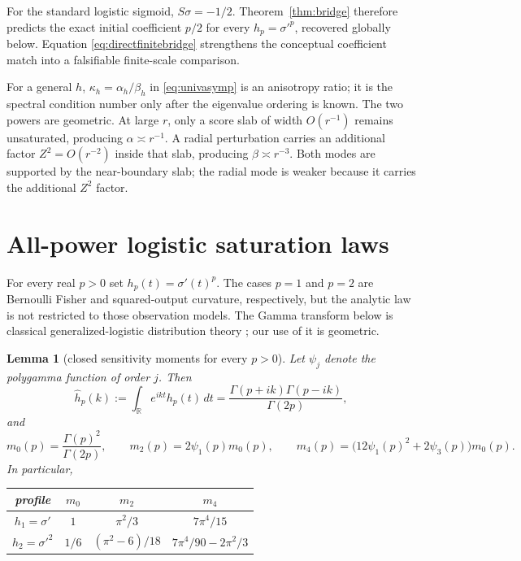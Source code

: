 \documentclass[11pt]{article}
\newtheorem{lemma}[theorem]{Lemma}
\newcommand{\R}{\mathbb R}
\begin{document}
For the standard logistic sigmoid, $S\sigma=-1/2$.  Theorem~\ref{thm:bridge} therefore predicts the exact initial
coefficient $p/2$ for every $h_p=\sigma'^p$, recovered globally below.  Equation
\eqref{eq:directfinitebridge} strengthens the conceptual coefficient match into a falsifiable finite-scale
comparison.

For a general $h$, $\kappa_h=\alpha_h/\beta_h$ in \eqref{eq:univasymp} is an anisotropy ratio; it is the spectral
condition number only after the eigenvalue ordering is known.  The two powers are geometric.  At large $r$, only a
score slab of width $O(r^{-1})$ remains unsaturated, producing
$\alpha\asymp r^{-1}$.  A radial perturbation carries an additional factor $Z^2=O(r^{-2})$ inside that slab,
producing $\beta\asymp r^{-3}$.  Both modes are supported by the near-boundary slab; the radial mode is weaker
because it carries the additional $Z^2$ factor.

\section{All-power logistic saturation laws}

For every real $p>0$ set $h_p(t)=\sigma'(t)^p$.  The cases $p=1$ and $p=2$ are Bernoulli Fisher and
squared-output curvature, respectively, but the analytic law is not restricted to those observation models.  The
Gamma transform below is classical generalized-logistic distribution theory \cite[eqs.~(2.3)--(2.5)]{ojo2004};
our use of it is geometric.

\begin{lemma}[closed sensitivity moments for every $p>0$]
\label{lem:moments}
Let $\psi_j$ denote the polygamma function of order $j$.  Then
\begin{equation}
 \widehat h_p(k):=\int_\R e^{ikt}h_p(t)\,dt
 =\frac{\Gamma(p+ik)\Gamma(p-ik)}{\Gamma(2p)},
 \label{eq:fourier}
\end{equation}
and
\begin{equation}
 m_0(p)=\frac{\Gamma(p)^2}{\Gamma(2p)},\qquad
 m_2(p)=2\psi_1(p)m_0(p),\qquad
 m_4(p)=\bigl(12\psi_1(p)^2+2\psi_3(p)\bigr)m_0(p).
 \label{eq:allpmoments}
\end{equation}
In particular,
\begin{center}
\begin{tabular}{c@{\qquad}ccc}
\toprule
profile & $m_0$ & $m_2$ & $m_4$\\
\midrule
$h_1=\sigma'$ & $1$ & $\pi^2/3$ & $7\pi^4/15$\\[2pt]
$h_2=\sigma'^2$ & $1/6$ & $(\pi^2-6)/18$ & $7\pi^4/90-2\pi^2/3$\\
\bottomrule
\end{tabular}
\end{center}
\end{lemma}
\end{document}
